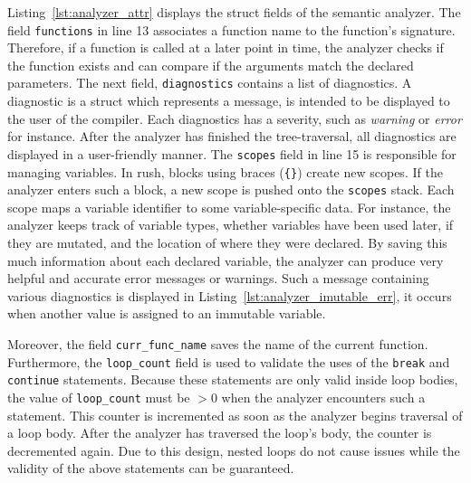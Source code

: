 Listing~\ref{lst:analyzer_attr} displays the struct fields of the semantic analyzer.
The field \texttt{functions} in line 13 associates a function name to the function's signature.
Therefore, if a function is called at a later point in time, the analyzer checks if the function exists and can compare if the arguments match the declared parameters.
The next field, \texttt{diagnostics} contains a list of diagnostics.
A diagnostic is a struct which represents a message, is intended to be displayed to the user of the compiler.
Each diagnostics has a severity, such as \emph{warning} or \emph{error} for instance.
After the analyzer has finished the tree-traversal, all diagnostics are displayed in a user-friendly manner.
The \texttt{scopes} field in line 15 is responsible for managing variables.
In rush, blocks using braces (\texttt{\{\}}) create new scopes.
If the analyzer enters such a block, a new scope is pushed onto the \texttt{scopes} stack.
Each scope maps a variable identifier to some variable-specific data.
For instance, the analyzer keeps track of variable types, whether variables have been used later, if they are mutated, and the location of where they were declared.
By saving this much information about each declared variable, the analyzer can produce very helpful and accurate error messages or warnings.
Such a message containing various diagnostics is displayed in Listing~\ref{lst:analyzer_imutable_err}, it occurs when another value is assigned to an immutable variable.


Moreover, the field \texttt{curr\_func\_name} saves the name of the current function.
Furthermore, the \texttt{loop\_count} field is used to validate the uses of the \texttt{break} and \texttt{continue} statements.
Because these statements are only valid inside loop bodies, the value of \texttt{loop\_count} must be $> 0$ when the analyzer encounters such a statement.
This counter is incremented as soon as the analyzer begins traversal of a loop body.
After the analyzer has traversed the loop's body, the counter is decremented again.
Due to this design, nested loops do not cause issues while the validity of the above statements can be guaranteed.

